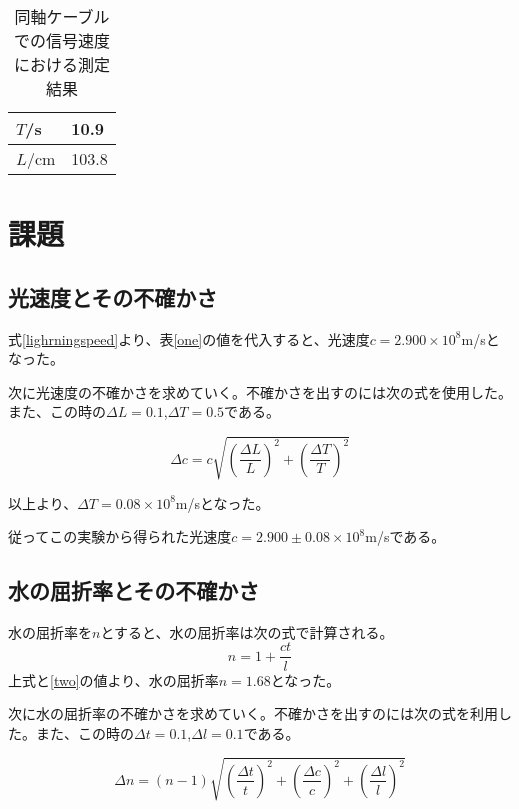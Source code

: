 \documentclass{jsarticle}
\begin{document}
\begin{table}[H]
\centering
\caption{同軸ケーブルでの信号速度における測定結果}
\label{three}
\begin{tabular}{|l|l|}
\hline
$T$/s  & 10.9  \\ \hline
$L$/cm & 103.8 \\ \hline
\end{tabular}
\end{table}


\section{課題}

\subsection{光速度とその不確かさ}
式\ref{lighrningspeed}より、表\ref{one}の値を代入すると、光速度$c = 2.900 \times 10^8$m/sとなった。\\
\par 次に光速度の不確かさを求めていく。不確かさを出すのには次の式を使用した。また、この時の$\Delta L = 0.1$,$\Delta T = 0.5$である。

\begin{equation}
    \Delta c = c\sqrt{(\frac{\Delta L}{L})^2 + (\frac{\Delta T}{T})^2}
\end{equation}

以上より、$\Delta T = 0.08 \times 10^8$m/sとなった。

従ってこの実験から得られた光速度$c = 2.900 \pm 0.08 \times 10^8$m/sである。




\subsection{水の屈折率とその不確かさ}
水の屈折率を$n$とすると、水の屈折率は次の式で計算される。
\begin{equation}
    n = 1 + \frac{ct}{l}
\end{equation}
上式と\ref{two}の値より、水の屈折率$n = 1.68$となった。\\
\par 次に水の屈折率の不確かさを求めていく。不確かさを出すのには次の式を利用した。また、この時の$\Delta t = 0.1$,$\Delta l = 0.1$である。

\begin{equation}
    \Delta n = (n-1)\sqrt{(\frac{\Delta t}{t})^2 + (\frac{\Delta c}{c})^2 + (\frac{\Delta l}{l})^2}
\end{equation}
\end{document}
